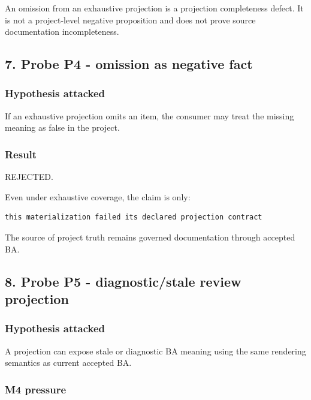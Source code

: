 \documentclass[11pt,a4paper]{article}
\begin{document}
An omission from an exhaustive projection is a projection completeness
defect. It is not a project-level negative proposition and does not
prove source documentation incompleteness.

\subsection{7. Probe P4 - omission as negative
fact}\label{7-probe-p4---omission-as-negative-fact}

\subsubsection{Hypothesis attacked}\label{hypothesis-attacked-3}

If an exhaustive projection omits an item, the consumer may treat the
missing meaning as false in the project.

\subsubsection{Result}\label{result-3}

REJECTED.

Even under exhaustive coverage, the claim is only:

\begin{verbatim}
this materialization failed its declared projection contract
\end{verbatim}

The source of project truth remains governed documentation through
accepted BA.

\subsection{8. Probe P5 - diagnostic/stale review
projection}\label{8-probe-p5---diagnosticstale-review-projection}

\subsubsection{Hypothesis attacked}\label{hypothesis-attacked-4}

A projection can expose stale or diagnostic BA meaning using the same
rendering semantics as current accepted BA.

\subsubsection{M4 pressure}\label{m4-pressure}
\end{document}
